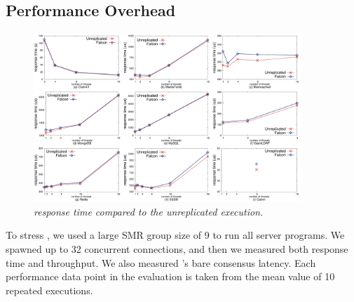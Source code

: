 % 


\subsection{Performance Overhead} \label{sec:overhead}

\begin{figure}[t]
\centering
\includegraphics[width=0.9\textwidth]{figures/latency}
\vspace{-.10in}
\caption{\small {\em \xxx response time compared to the unreplicated
execution.}}
\vspace{-.20in}
\label{fig:latency}
\end{figure}

To stress \xxx, we used a large SMR group size of 9 to run all server programs. 
We spawned up to 32 concurrent connections, and then we measured both response 
time and throughput. We also measured \xxx's bare consensus latency. Each 
performance data point in the evaluation is taken from the mean value of 
10 repeated executions.

